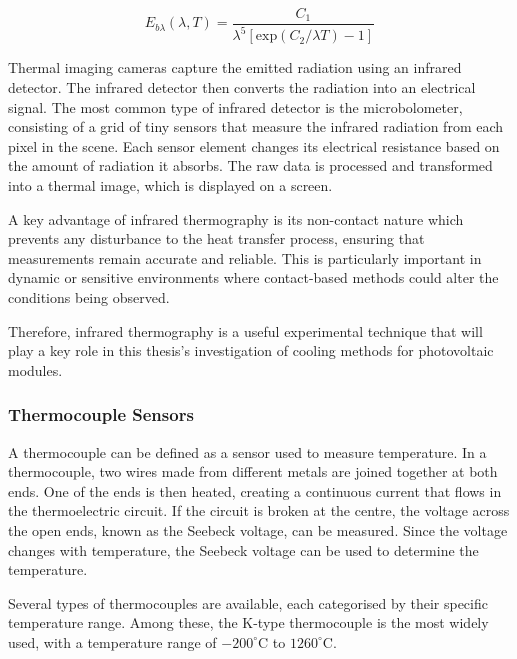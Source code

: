 \begin{equation}
    E_{b\lambda}(\lambda,T)=\frac{C_1}{\lambda^5[\text{exp}(C_2/\lambda T)-1]}
    \label{eq:plancks_law}
\end{equation}

Thermal imaging cameras capture the emitted radiation using an infrared detector. The infrared detector then converts the radiation into an electrical signal. The most common type of infrared detector is the microbolometer, consisting of a grid of tiny sensors that measure the infrared radiation from each pixel in the scene. Each sensor element changes its electrical resistance based on the amount of radiation it absorbs. The raw data is processed and transformed into a thermal image, which is displayed on a screen.\vspace{0.5em}

A key advantage of infrared thermography is its non-contact nature which prevents any disturbance to the heat transfer process, ensuring that measurements remain accurate and reliable. This is particularly important in dynamic or sensitive environments where contact-based methods could alter the conditions being observed.\vspace{0.5em}

Therefore, infrared thermography is a useful experimental technique that will play a key role in this thesis's investigation of cooling methods for photovoltaic modules. \cite{HistoryofSimpleThings2024HowWork}

\subsubsection{Thermocouple Sensors}
A thermocouple can be defined as a sensor used to measure temperature. In a thermocouple, two wires made from different metals are joined together at both ends. One of the ends is then heated, creating a continuous current that flows in the thermoelectric circuit. If the circuit is broken at the centre, the voltage across the open ends, known as the Seebeck voltage, can be measured. Since the voltage changes with temperature, the Seebeck voltage can be used to determine the temperature. \cite{OmegaEngineeringThermocouplesEngineering}\vspace{0.5em}

Several types of thermocouples are available, each categorised by their specific temperature range. Among these, the K-type thermocouple is the most widely used, with a temperature range of $-200^\circ \text{C}$ to $1260^\circ \text{C}$. \cite{TheEngineeringMindset2020HowRTD} \vspace{0.5em}

